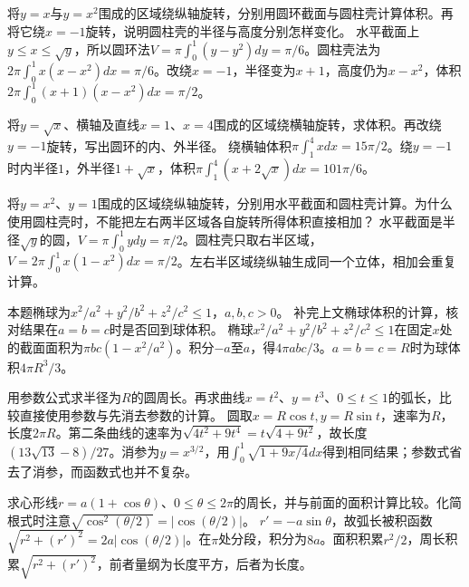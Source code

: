 将\(y=x\)与\(y=x^2\)围成的区域绕纵轴旋转，分别用圆环截面与圆柱壳计算体积。再将它绕\(x=-1\)旋转，说明圆柱壳的半径与高度分别怎样变化。
\solutionanswer
水平截面上\(y\le x\le\sqrt y\)，所以圆环法\(V=\pi\int_0^1(y-y^2)dy=\pi/6\)。圆柱壳法为\(2\pi\int_0^1x(x-x^2)dx=\pi/6\)。改绕\(x=-1\)，半径变为\(x+1\)，高度仍为\(x-x^2\)，体积\(2\pi\int_0^1(x+1)(x-x^2)dx=\pi/2\)。


将\(y=\sqrt{x}\)、横轴及直线\(x=1\)、\(x=4\)围成的区域绕横轴旋转，求体积。再改绕\(y=-1\)旋转，写出圆环的内、外半径。
\solutionanswer
绕横轴体积\(\pi\int_1^4x dx=15\pi/2\)。绕\(y=-1\)时内半径\(1\)，外半径\(1+\sqrt x\)，体积\(\pi\int_1^4(x+2\sqrt x)dx=101\pi/6\)。


将\(y=x^2\)、\(y=1\)围成的区域绕纵轴旋转，分别用水平截面和圆柱壳计算。为什么使用圆柱壳时，不能把左右两半区域各自旋转所得体积直接相加？
\solutionanswer
水平截面是半径\(\sqrt y\)的圆，\(V=\pi\int_0^1y dy=\pi/2\)。圆柱壳只取右半区域，\(V=2\pi\int_0^1x(1-x^2)dx=\pi/2\)。左右半区域绕纵轴生成同一个立体，相加会重复计算。


本题椭球为\(x^2/a^2+y^2/b^2+z^2/c^2\le1\)，\(a,b,c>0\)。
补完上文椭球体积的计算，核对结果在\(a=b=c\)时是否回到球体积。
\solutionanswer
椭球\(x^2/a^2+y^2/b^2+z^2/c^2\le1\)在固定\(x\)处的截面面积为\(\pi bc(1-x^2/a^2)\)。积分\(-a\)至\(a\)，得\(4\pi abc/3\)。\(a=b=c=R\)时为球体积\(4\pi R^3/3\)。


用参数公式求半径为\(R\)的圆周长。再求曲线\(x=t^2\)、\(y=t^3\)、\(0\le t\le1\)的弧长，比较直接使用参数与先消去参数的计算。
\solutionanswer
圆取\(x=R\cos t,y=R\sin t\)，速率为\(R\)，长度\(2\pi R\)。第二条曲线的速率为\(\sqrt{4t^2+9t^4}=t\sqrt{4+9t^2}\)，故长度\((13\sqrt{13}-8)/27\)。消参为\(y=x^{3/2}\)，用\(\int_0^1\sqrt{1+9x/4}dx\)得到相同结果；参数式省去了消参，而函数式也并不复杂。


求心形线\(r=a(1+\cos\theta)\)、\(0\le\theta\le2\pi\)的周长，并与前面的面积计算比较。化简根式时注意\(\sqrt{\cos^2(\theta/2)}=|\cos(\theta/2)|\)。
\solutionanswer
\(r'=-a\sin\theta\)，故弧长被积函数\(\sqrt{r^2+(r')^2}=2a|\cos(\theta/2)|\)。在\(\pi\)处分段，积分为\(8a\)。面积积累\(r^2/2\)，周长积累\(\sqrt{r^2+(r')^2}\)，前者量纲为长度平方，后者为长度。


